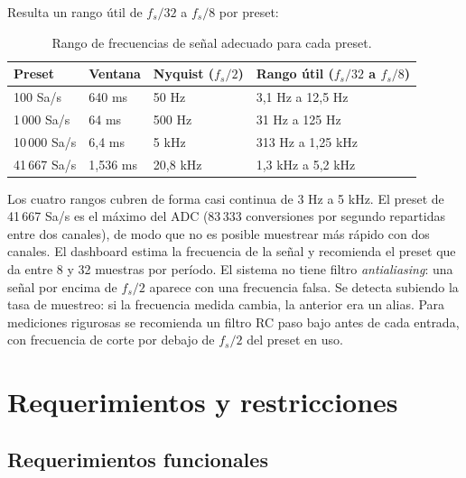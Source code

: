 \documentclass[12pt,a4paper]{article}
\begin{document}
Resulta un rango útil de $f_s/32$ a $f_s/8$ por preset:

\begin{table}[H]
\centering
\small
\begin{tabular}{@{}p{2.4cm} p{2.6cm} p{3.0cm} p{4.6cm}@{}}
\toprule
\textbf{Preset} & \textbf{Ventana} & \textbf{Nyquist ($f_s/2$)} & \textbf{Rango útil ($f_s/32$ a $f_s/8$)} \\
\midrule
100 Sa/s     & 640 ms     & 50 Hz     & 3{,}1 Hz a 12{,}5 Hz \\
1\,000 Sa/s  & 64 ms      & 500 Hz    & 31 Hz a 125 Hz \\
10\,000 Sa/s & 6{,}4 ms   & 5 kHz     & 313 Hz a 1{,}25 kHz \\
41\,667 Sa/s & 1{,}536 ms & 20{,}8 kHz & 1{,}3 kHz a 5{,}2 kHz \\
\bottomrule
\end{tabular}
\caption{Rango de frecuencias de señal adecuado para cada preset.}
\end{table}

Los cuatro rangos cubren de forma casi continua de 3 Hz a 5 kHz. El preset de 41\,667 Sa/s es el máximo del ADC (83\,333 conversiones por segundo repartidas entre dos canales), de modo que no es posible muestrear más rápido con dos canales. El dashboard estima la frecuencia de la señal y recomienda el preset que da entre 8 y 32 muestras por período. El sistema no tiene filtro \emph{antialiasing}: una señal por encima de $f_s/2$ aparece con una frecuencia falsa. Se detecta subiendo la tasa de muestreo: si la frecuencia medida cambia, la anterior era un alias. Para mediciones rigurosas se recomienda un filtro RC paso bajo antes de cada entrada, con frecuencia de corte por debajo de $f_s/2$ del preset en uso.

\section{Requerimientos y restricciones}

\subsection{Requerimientos funcionales}
\end{document}

